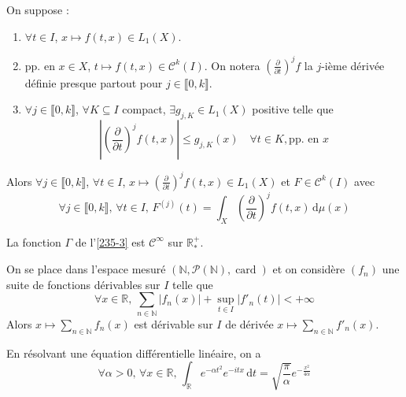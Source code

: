   \begin{theorem}
    On suppose :
    \begin{enumerate}[label={\bfseries(\roman*)}]
      \item $\forall t \in I$, $x \mapsto f(t,x) \in L_1(X)$.
      \item pp. en $x \in X$, $t \mapsto f(t,x) \in \mathcal{C}^k(I)$. On notera $\left(\frac{\partial}{\partial t}\right)^j f$ la $j$-ième dérivée définie presque partout pour $j \in \llbracket 0, k \rrbracket$.
      \item $\forall j \in \llbracket 0, k \rrbracket$, $\forall K \subseteq I$ compact, $\exists g_{j,K} \in L_1(X)$ positive telle que
      \[ \left| \left(\frac{\partial}{\partial t}\right)^j f(t,x) \right| \leq g_{j,K}(x) \quad \forall t \in K, \text{pp. en } x \]
    \end{enumerate}
    Alors $\forall j \in \llbracket 0, k \rrbracket$, $\forall t \in I$, $x \mapsto \left(\frac{\partial}{\partial t}\right)^j f(t,x) \in L_1(X)$ et $F \in \mathcal{C}^k(I)$ avec
    \[ \forall j \in \llbracket 0, k \rrbracket, \, \forall t \in I, \, F^{(j)}(t) = \int_X \left(\frac{\partial}{\partial t}\right)^j f(t, x) \, \mathrm{d}\mu(x) \]
  \end{theorem}


  \begin{example}
    La fonction $\Gamma$ de l'\cref{235-3} est $\mathcal{C}^\infty$ sur $\mathbb{R}^+_*$.
  \end{example}


  \begin{example}
    On se place dans l'espace mesuré $(\mathbb{N}, \mathcal{P}(\mathbb{N}), \operatorname{card})$ et on considère $(f_n)$ une suite de fonctions dérivables sur $I$ telle que
    \[ \forall x \in \mathbb{R}, \, \sum_{n \in \mathbb{N}} |f_n(x)| + \sup_{t \in I} |f'_n(t)| < +\infty \]
    Alors $x \mapsto \sum_{n \in \mathbb{N}} f_n(x)$ est dérivable sur $I$ de dérivée $x \mapsto \sum_{n \in \mathbb{N}} f'_n(x)$.
  \end{example}


  \begin{application}
    En résolvant une équation différentielle linéaire, on a
    \[ \forall \alpha > 0, \, \forall x \in \mathbb{R}, \, \int_{\mathbb{R}} e^{-\alpha t^2} e^{-itx} \, \mathrm{d}t = \sqrt{\frac{\pi}{\alpha}} e^{-\frac{x^2}{4 \alpha}} \]
  \end{application}

